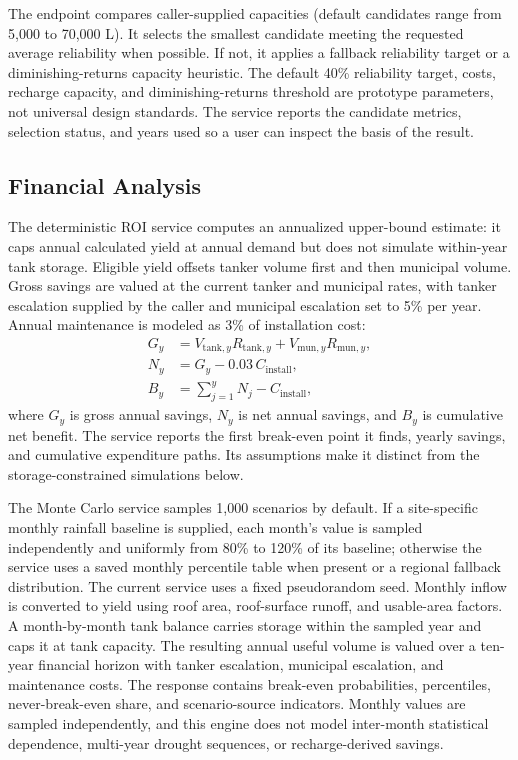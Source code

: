 \documentclass[conference]{IEEEtran}
\begin{document}
The endpoint compares caller-supplied capacities (default candidates
range from 5,000 to 70,000 L). It selects the smallest candidate meeting
the requested average reliability when possible. If not, it applies a
fallback reliability target or a diminishing-returns capacity heuristic.
The default 40\% reliability target, costs, recharge capacity, and
diminishing-returns threshold are prototype parameters, not universal
design standards. The service reports the candidate metrics, selection
status, and years used so a user can inspect the basis of the result.

\subsection{Financial Analysis}
\label{sec:roi}

The deterministic ROI service computes an annualized upper-bound
estimate: it caps annual calculated yield at annual demand but does not
simulate within-year tank storage. Eligible yield offsets tanker volume
first and then municipal volume. Gross savings are valued at the current
tanker and municipal rates, with tanker escalation supplied by the caller
and municipal escalation set to 5\% per year. Annual maintenance is
modeled as 3\% of installation cost:
\begin{align}
  G_y &= V_{\mathrm{tank},y}R_{\mathrm{tank},y}
       + V_{\mathrm{mun},y}R_{\mathrm{mun},y},\\
  N_y &= G_y - 0.03\,C_{\mathrm{install}},\\
  B_y &= \sum_{j=1}^{y} N_j - C_{\mathrm{install}},
  \label{eq:roi}
\end{align}
where $G_y$ is gross annual savings, $N_y$ is net annual savings, and
$B_y$ is cumulative net benefit. The service reports the first
break-even point it finds, yearly savings, and cumulative expenditure
paths. Its assumptions make it distinct from the storage-constrained
simulations below.

The Monte Carlo service samples 1,000 scenarios by default. If a
site-specific monthly rainfall baseline is supplied, each month's value
is sampled independently and uniformly from 80\% to 120\% of its
baseline; otherwise the service uses a saved monthly percentile table
when present or a regional fallback distribution. The current service
uses a fixed pseudorandom seed. Monthly inflow is converted to yield
using roof area, roof-surface runoff, and usable-area factors. A
month-by-month tank balance carries storage within the sampled year and
caps it at tank capacity. The resulting annual useful volume is valued
over a ten-year financial horizon with tanker escalation, municipal
escalation, and maintenance costs. The response contains break-even
probabilities, percentiles, never-break-even share, and scenario-source
indicators. Monthly values are sampled independently, and this engine
does not model inter-month statistical dependence, multi-year drought
sequences, or recharge-derived savings.
\end{document}

